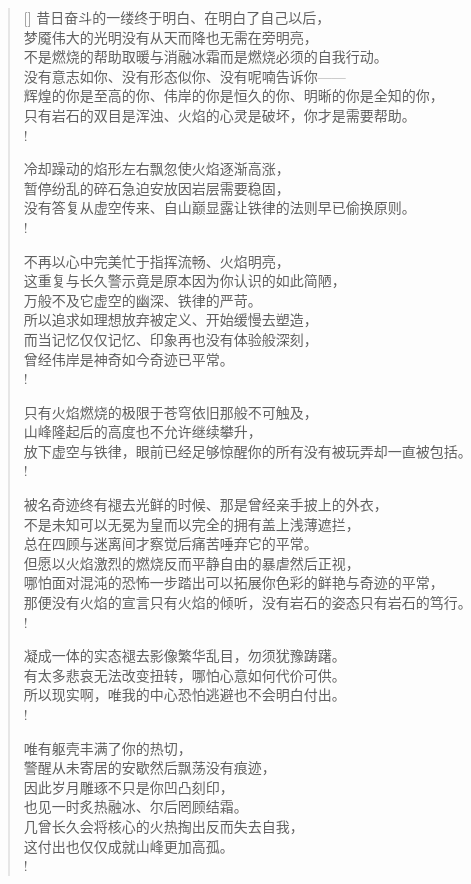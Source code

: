 \documentclass[UTF8, 12pt, a4paper]{ctexrep} %
\begin{document}
\begin{verse}[\versewidth]
昔日奋斗的一缕终于明白、在明白了自己以后，\\
梦魇伟大的光明没有从天而降也无需在旁明亮，\\
不是燃烧的帮助取暖与消融冰霜而是燃烧必须的自我行动。\\
没有意志如你、没有形态似你、没有呢喃告诉你——\\
辉煌的你是至高的你、伟岸的你是恒久的你、明晰的你是全知的你，\\
只有岩石的双目是浑浊、火焰的心灵是破坏，你才是需要帮助。\\!

冷却躁动的焰形左右飘忽使火焰逐渐高涨，\\
暂停纷乱的碎石急迫安放因岩层需要稳固，\\
没有答复从虚空传来、自山巅显露让铁律的法则早已偷换原则。\\!

不再以心中完美忙于指挥流畅、火焰明亮，\\
这重复与长久警示竟是原本因为你认识的如此简陋，\\
万般不及它虚空的幽深、铁律的严苛。\\
所以追求如理想放弃被定义、开始缓慢去塑造，\\
而当记忆仅仅记忆、印象再也没有体验般深刻，\\
曾经伟岸是神奇如今奇迹已平常。\\!

只有火焰燃烧的极限于苍穹依旧那般不可触及，\\
山峰隆起后的高度也不允许继续攀升，\\
放下虚空与铁律，眼前已经足够惊醒你的所有没有被玩弄却一直被包括。\\!

被名奇迹终有褪去光鲜的时候、那是曾经亲手披上的外衣，\\
不是未知可以无冕为皇而以完全的拥有盖上浅薄遮拦，\\
总在四顾与迷离间才察觉后痛苦唾弃它的平常。\\
但愿以火焰激烈的燃烧反而平静自由的暴虐然后正视，\\
哪怕面对混沌的恐怖一步踏出可以拓展你色彩的鲜艳与奇迹的平常，\\
那便没有火焰的宣言只有火焰的倾听，没有岩石的姿态只有岩石的笃行。\\!

凝成一体的实态褪去影像繁华乱目，勿须犹豫踌躇。\\
有太多悲哀无法改变扭转，哪怕心意如何代价可供。\\
所以现实啊，唯我的中心恐怕逃避也不会明白付出。\\!

唯有躯壳丰满了你的热切，\\
警醒从未寄居的安歇然后飘荡没有痕迹，\\
因此岁月雕琢不只是你凹凸刻印，\\
也见一时炙热融冰、尔后罔顾结霜。\\
几曾长久会将核心的火热掏出反而失去自我，\\
这付出也仅仅成就山峰更加高孤。\\!

\end{verse}
\end{document}
